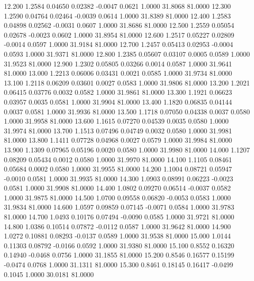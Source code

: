   12.200   1.2584   0.04650   0.02382  -0.0047   0.0621   1.0000  31.8068  81.0000
  12.300   1.2590   0.04764   0.02464  -0.0039   0.0614   1.0000  31.8389  81.0000
  12.400   1.2583   0.04898   0.02562  -0.0031   0.0607   1.0000  31.8686  81.0000
  12.500   1.2559   0.05054   0.02678  -0.0023   0.0602   1.0000  31.8954  81.0000
  12.600   1.2517   0.05227   0.02809  -0.0014   0.0597   1.0000  31.9184  81.0000
  12.700   1.2457   0.05413   0.02953  -0.0004   0.0593   1.0000  31.9371  81.0000
  12.800   1.2385   0.05607   0.03107   0.0005   0.0589   1.0000  31.9523  81.0000
  12.900   1.2302   0.05805   0.03266   0.0014   0.0587   1.0000  31.9641  81.0000
  13.000   1.2213   0.06006   0.03431   0.0021   0.0585   1.0000  31.9734  81.0000
  13.100   1.2118   0.06209   0.03601   0.0027   0.0583   1.0000  31.9806  81.0000
  13.200   1.2021   0.06415   0.03776   0.0032   0.0582   1.0000  31.9861  81.0000
  13.300   1.1921   0.06623   0.03957   0.0035   0.0581   1.0000  31.9904  81.0000
  13.400   1.1820   0.06835   0.04144   0.0037   0.0581   1.0000  31.9936  81.0000
  13.500   1.1718   0.07050   0.04338   0.0037   0.0580   1.0000  31.9958  81.0000
  13.600   1.1615   0.07270   0.04539   0.0035   0.0580   1.0000  31.9974  81.0000
  13.700   1.1513   0.07496   0.04749   0.0032   0.0580   1.0000  31.9981  81.0000
  13.800   1.1411   0.07728   0.04968   0.0027   0.0579   1.0000  31.9984  81.0000
  13.900   1.1309   0.07965   0.05196   0.0020   0.0580   1.0000  31.9980  81.0000
  14.000   1.1207   0.08209   0.05434   0.0012   0.0580   1.0000  31.9970  81.0000
  14.100   1.1105   0.08461   0.05684   0.0002   0.0580   1.0000  31.9955  81.0000
  14.200   1.1004   0.08721   0.05947  -0.0010   0.0581   1.0000  31.9935  81.0000
  14.300   1.0903   0.08991   0.06223  -0.0023   0.0581   1.0000  31.9908  81.0000
  14.400   1.0802   0.09270   0.06514  -0.0037   0.0582   1.0000  31.9875  81.0000
  14.500   1.0700   0.09558   0.06820  -0.0053   0.0583   1.0000  31.9834  81.0000
  14.600   1.0597   0.09859   0.07145  -0.0071   0.0584   1.0000  31.9783  81.0000
  14.700   1.0493   0.10176   0.07494  -0.0090   0.0585   1.0000  31.9721  81.0000
  14.800   1.0386   0.10514   0.07872  -0.0112   0.0587   1.0000  31.9642  81.0000
  14.900   1.0272   0.10881   0.08293  -0.0137   0.0589   1.0000  31.9538  81.0000
  15.000   1.0144   0.11303   0.08792  -0.0166   0.0592   1.0000  31.9380  81.0000
  15.100   0.8552   0.16320   0.14940  -0.0468   0.0756   1.0000  31.1855  81.0000
  15.200   0.8546   0.16577   0.15199  -0.0474   0.0768   1.0000  31.1311  81.0000
  15.300   0.8461   0.18145   0.16417  -0.0499   0.1045   1.0000  30.0181  81.0000
